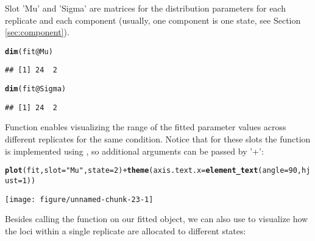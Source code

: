 \documentclass[a4paper,10pt]{article}\usepackage[]{graphicx}\usepackage[]{color}
\makeatletter
\def\maxwidth{ %
  \ifdim\Gin@nat@width>\linewidth
    \linewidth
  \else
    \Gin@nat@width
  \fi
}
\newcommand{\hlnum}[1]{\textcolor[rgb]{0.686,0.059,0.569}{#1}}%
\newcommand{\hlstr}[1]{\textcolor[rgb]{0.192,0.494,0.8}{#1}}%
\newcommand{\hlopt}[1]{\textcolor[rgb]{0,0,0}{#1}}%
\newcommand{\hlstd}[1]{\textcolor[rgb]{0.345,0.345,0.345}{#1}}%
\newcommand{\hlkwc}[1]{\textcolor[rgb]{0.333,0.667,0.333}{#1}}%
\newcommand{\hlkwd}[1]{\textcolor[rgb]{0.737,0.353,0.396}{\textbf{#1}}}%
\newenvironment{kframe}{%
 \def\at@end@of@kframe{}%
 \ifinner\ifhmode%
  \def\at@end@of@kframe{\end{minipage}}%
  \begin{minipage}{\columnwidth}%
 \fi\fi%
 \def\FrameCommand##1{\hskip\@totalleftmargin \hskip-\fboxsep
 \colorbox{shadecolor}{##1}\hskip-\fboxsep
     \hskip-\linewidth \hskip-\@totalleftmargin \hskip\columnwidth}%
 \MakeFramed {\advance\hsize-\width
   \@totalleftmargin\z@ \linewidth\hsize
   \@setminipage}}%
 {\par\unskip\endMakeFramed%
 \at@end@of@kframe}
\newenvironment{knitrout}{}{} %
\makeatother
\begin{document}
Slot 'Mu' and 'Sigma' are matrices for the distribution parameters for each replicate and each component (usually, one component is one state, see Section \ref{sec:component}).

\begin{knitrout}
\color{fgcolor}\begin{kframe}
\begin{alltt}
\hlkwd{dim}\hlstd{(fit}\hlopt{@}\hlkwc{Mu}\hlstd{)}
\end{alltt}
\begin{verbatim}
## [1] 24  2
\end{verbatim}
\begin{alltt}
\hlkwd{dim}\hlstd{(fit}\hlopt{@}\hlkwc{Sigma}\hlstd{)}
\end{alltt}
\begin{verbatim}
## [1] 24  2
\end{verbatim}
\end{kframe}
\end{knitrout}

Function  enables visualizing the range of the fitted parameter values across different replicates for the same condition. Notice that for these slots the function is implemented using , so additional arguments can be passed by '+':

\begin{knitrout}
\color{fgcolor}\begin{kframe}
\begin{alltt}
\hlkwd{plot}\hlstd{(fit,} \hlkwc{slot} \hlstd{=} \hlstr{"Mu"}\hlstd{,} \hlkwc{state} \hlstd{=} \hlnum{2}\hlstd{)} \hlopt{+} \hlkwd{theme}\hlstd{(}\hlkwc{axis.text.x} \hlstd{=} \hlkwd{element_text}\hlstd{(}\hlkwc{angle} \hlstd{=} \hlnum{90}\hlstd{,} \hlkwc{hjust} \hlstd{=} \hlnum{1}\hlstd{))}
\end{alltt}
\end{kframe}

{\centering \texttt{[image: figure/unnamed-chunk-23-1]} 

}



\end{knitrout}

Besides calling the  function on our fitted object, we can also use  to visualize how the loci within a single replicate are allocated to different states:
\end{document}
